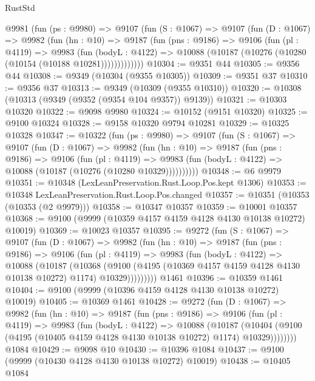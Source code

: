 \begin{lexlean}{RustStd}
\begin{coremodule}
    @9981
      (fun (ps : @9980) =>
      @9107
        (fun (S : @1067) =>
        @9107
          (fun (D : @1067) =>
          @9982
            (fun (hn : @10) =>
            @9187
              (fun (pns : @9186) =>
              @9106
                (fun (pl : @4119) =>
                @9983
                  (fun (bodyL : @4122) =>
                  @10088 (@10187 (@10276 (@10280 (@10154 (@10188 @10281)))))))))))))
@10304 := @9351 @44
@10305 := @9356 @44
@10308 := @9349 (@10304 (@9355 @10305))
@10309 := @9351 @37
@10310 := @9356 @37
@10313 := @9349 (@10309 (@9355 @10310))
@10320 := @10308 (@10313 (@9349 (@9352 (@9354 @104 @9357)) @9139))
@10321 := @10303 @10320
@10322 := @9098 @9980
@10324 := @10152 (@9151 @10320)
@10325 := @9100 @10324
@10328 := @9158 @10320 @9794 @10281
@10329 := @10325 @10328
@10347 := @10322
    (fun (ps : @9980) =>
    @9107
      (fun (S : @1067) =>
      @9107
        (fun (D : @1067) =>
        @9982
          (fun (hn : @10) =>
          @9187
            (fun (pns : @9186) =>
            @9106
              (fun (pl : @4119) =>
              @9983 (fun (bodyL : @4122) => @10088 (@10187 (@10276 (@10280 @10329))))))))))
@10348 := @6 @9979
@10351 := @10348 (LexLeanPreservation.Rust.Loop.Pos.kept @1306)
@10353 := @10348 LexLeanPreservation.Rust.Loop.Pos.changed
@10357 := @10351 (@10353 (@10353 (@2 @9979)))
@10358 := @10347 @10357
@10359 := @10001 @10357
@10368 := @9100 (@9999 (@10359 @4157 @4159 @4128 @4130 @10138 @10272) @10019)
@10369 := @10023 @10357
@10395 := @9272
    (fun (S : @1067) =>
    @9107
      (fun (D : @1067) =>
      @9982
        (fun (hn : @10) =>
        @9187
          (fun (pns : @9186) =>
          @9106
            (fun (pl : @4119) =>
            @9983
              (fun (bodyL : @4122) =>
              @10088
                (@10187
                  (@10368
                    (@9100
                      (@4195 (@10369 @4157 @4159 @4128 @4130 @10138 @10272) @1174)
                      @10329)))))))))
    @1461
@10396 := @10359 @1461
@10404 := @9100 (@9999 (@10396 @4159 @4128 @4130 @10138 @10272) @10019)
@10405 := @10369 @1461
@10428 := @9272
    (fun (D : @1067) =>
    @9982
      (fun (hn : @10) =>
      @9187
        (fun (pns : @9186) =>
        @9106
          (fun (pl : @4119) =>
          @9983
            (fun (bodyL : @4122) =>
            @10088
              (@10187
                (@10404 (@9100 (@4195 (@10405 @4159 @4128 @4130 @10138 @10272) @1174) @10329))))))))
    @1084
@10429 := @9098 @10
@10430 := @10396 @1084
@10437 := @9100 (@9999 (@10430 @4128 @4130 @10138 @10272) @10019)
@10438 := @10405 @1084

\end{coremodule}
\end{lexlean}
